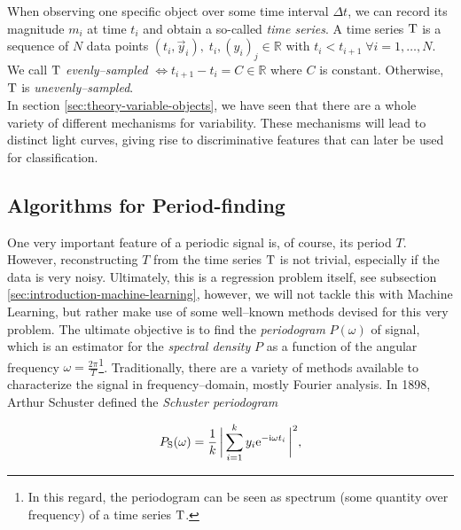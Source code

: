 When observing one specific object over some time interval $\Delta t$, we can record its magnitude $m_i$ at time $t_i$ and obtain a so-called \emph{time series}. A time series $\mathrm{T}$ is a sequence of $N$ data points $(t_i, \vec y_i),\; t_i,(y_i)_j \in \mathbb{R}$ with $t_i < t_{i+1} \; \forall i = 1,\ldots,N$. We call $\mathrm{T}$ \emph{evenly--sampled} $\Leftrightarrow t_{i+1} - t_i = C \in \mathbb{R}$ where $C$ is constant. Otherwise, $\mathrm{T}$ is \emph{unevenly--sampled}.\\

In section \ref{sec:theory-variable-objects}, we have seen that there are a whole variety of different mechanisms for variability. These mechanisms will lead to distinct light curves, giving rise to discriminative features that can later be used for classification.

\subsection{Algorithms for Period-finding}
\label{subsec:period-finding}

One very important feature of a periodic signal is, of course, its period $T$. However, reconstructing $T$ from the time series $\mathrm{T}$ is not trivial, especially if the data is very noisy. Ultimately, this is a regression problem itself, see subsection \ref{sec:introduction-machine-learning}, however, we will not tackle this with Machine Learning, but rather make use of some well--known methods devised for this very problem. The ultimate objective is to find the \emph{periodogram} $P(\omega)$ of signal, which is an estimator for the \emph{spectral density} $P$ as a function of the angular frequency $\omega = \frac{2 \pi}{T}$\footnote{In this regard, the periodogram can be seen as spectrum (some quantity over frequency) of a time series $\mathrm{T}$.}. Traditionally, there are a variety of methods available to characterize the signal in frequency--domain, mostly Fourier analysis. In 1898, Arthur Schuster defined the \emph{Schuster periodogram}

\begin{equation}
\label{eg:schuster-periodogram}
P_{\text{S}}(\omega) = \frac{1}{k} \, \biggl| \, \sum\limits_{i=1}^{k} y_i \mathrm{e}^{-\mathrm{i} \omega t_i} \, \biggr|^2,
\end{equation}


